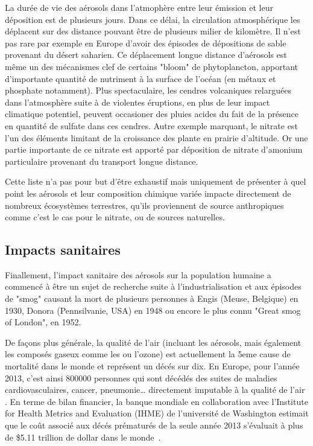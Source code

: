 La durée de vie des aérosols dans l'atmophère entre leur émission et leur déposition est
de plusieurs jours. Dans ce délai, la circulation atmosphérique les déplacent sur des
distance pouvant être de plusieurs milier de kilomètre. Il n'est pas rare par exemple en
Europe d'avoir des épisodes de dépositions de sable provenant du désert saharien. Ce
déplacement longue distance d'aérosols est même un des mécanismes clef de certains "bloom"
de phytoplancton, apportant d'importante quantité de nutriment à la surface de l'océan (en
métaux et phosphate notamment).
Plus spectaculaire, les cendres volcaniques relarguées dans l'atmosphère suite à de
violentes éruptions, en plus de leur impact climatique potentiel, peuvent occasioner des
pluies acides du fait de la présence en quantité de sulfate dans ces cendres.
Autre exemple marquant, le nitrate est l'un des éléments limitant de la croissance des
plante en prairie d'altitude. Or une partie importante de ce nitrate est apporté par
déposition de nitrate d'amonium particulaire provenant du transport longue distance.

Cette liste n'a pas pour but d'être exhaustif mais uniquement de présenter à quel point
les aérosols et leur composition chimique variée impacte directement de nombreux
écosystèmes terrestres, qu'ils proviennent de source anthropiques comme c'est le cas pour le
nitrate, ou de sources naturelles.

\subsection{Impacts sanitaires}%
\label{sub:impacts_sanitaires}

Finallement, l'impact sanitaire des aérosols sur la population humaine a commencé à être
un sujet de recherche suite à l'industrialisation et aux épisodes de "smog" causant la
mort de plusieurs personnes à Engis (Meuse, Belgique) en 1930, Donora (Pennsilvanie, USA)
en 1948 ou encore le plus connu "Great smog of London", en 1952.

De façons plus générale, la qualité de l'air (incluant les aérosols, mais également les
composés gaseux comme les  ou l'ozone) est actuellement la 5eme cause de
mortalité dans le monde et représent un décés sur dix. En Europe, pour l'année 2013, c'est
ainsi \num{800000} personnes qui sont décédés des suites de maladies cardiovasculaires,
cancer, pneumonie… directement imputable à la qualité de l'air
\autocite{worldhealthorganizationAmbient2016}.
En terme de bilan financier, la banque mondiale en collaboration avec l'Institute for
Health Metrics and Evaluation (IHME) de l'université de Washington estimait que le coût
associé aux décés prématurés de la seule année 2013 s'évaluait à plus de \$5.11 trillion
de dollar dans le monde~\autocite{worldbankCost2016}.


